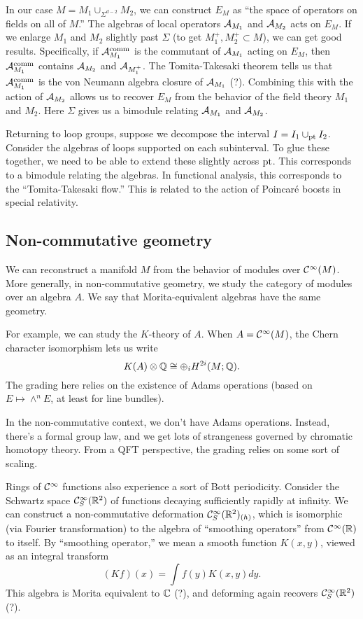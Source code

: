 In our case $M = M_1 \cup_{\Sigma^{d-2}} M_2$, we can construct $E_M$ as ``the space of operators on fields on all of $M$.''
The algebras of local operators $\mathcal{A}_{M_1}$ and $\mathcal{A}_{M_2}$ acts on $E_M$.
If we enlarge $M_1$ and $M_2$ slightly past $\Sigma$ (to get $M_1^+, M_2^+ \subset M$), we can get good results.
Specifically, if $\mathcal{A}_{M_1}^{\mathrm{comm}}$ is the commutant of $\mathcal{A}_{M_1}$ acting on $E_M$, then $\mathcal{A}_{M_1}^{\mathrm{comm}}$ contains $\mathcal{A}_{M_2}$ and $\mathcal{A}_{M_1^+}$.
The Tomita-Takesaki theorem tells us that $\mathcal{A}_{M_1}^{\mathrm{comm}}$ is the von Neumann algebra closure of $\mathcal{A}_{M_1}$ (?).
Combining this with the action of $\mathcal{A}_{M_2}$ allows us to recover $E_M$ from the behavior of the field theory $M_1$ and $M_2$.
Here $\Sigma$ gives us a bimodule relating $\mathcal{A}_{M_1}$ and $\mathcal{A}_{M_2}$.

\begin{ex}
	Returning to loop groups, suppose we decompose the interval $I = I_1 \cup_{\operatorname{pt}} I_2$.
	Consider the algebras of loops supported on each subinterval.
	To glue these together, we need to be able to extend these slightly across $\operatorname{pt}$.
	This corresponds to a bimodule relating the algebras.
	In functional analysis, this corresponds to the ``Tomita-Takesaki flow.''
	This is related to the action of Poincar\'e boosts in special relativity.
\end{ex}

\subsection{Non-commutative geometry}

We can reconstruct a manifold $M$ from the behavior of modules over $\mathcal{C}^\infty(M)$.
More generally, in non-commutative geometry, we study the category of modules over an algebra $A$.
We say that Morita-equivalent algebras have the same geometry.

For example, we can study the $K$-theory of $A$.
When $A = \mathcal{C}^\infty(M)$, the Chern character isomorphism lets us write
\[
	K(A) \otimes \mathbb{Q} \cong \oplus_i H^{2i}(M; \mathbb{Q}).
\]
The grading here relies on the existence of Adams operations (based on $E \mapsto \wedge^n E$, at least for line bundles).

In the non-commutative context, we don't have Adams operations.
Instead, there's a formal group law, and we get lots of strangeness governed by chromatic homotopy theory.
From a QFT perspective, the grading relies on some sort of scaling.

Rings of $\mathcal{C}^\infty$ functions also experience a sort of Bott periodicity.
Consider the Schwartz space $\mathcal{C}^\infty_S(\mathbb{R}^2)$ of functions decaying sufficiently rapidly at infinity.
We can construct a non-commutative deformation $\mathcal{C}^\infty_S(\mathbb{R}^2)_{(h)}$, which is isomorphic (via Fourier transformation) to the algebra of ``smoothing operators'' from $\mathcal{C}^\infty(\mathbb{R})$ to itself.
By ``smoothing operator,'' we mean a smooth function $K(x, y)$, viewed as an integral transform
\[
	(Kf)(x) = \int f(y) K(x, y) dy.
\]
This algebra is Morita equivalent to $\mathbb{C}$ (?), and deforming again recovers $\mathcal{C}^\infty_S(\mathbb{R}^2)$ (?).

